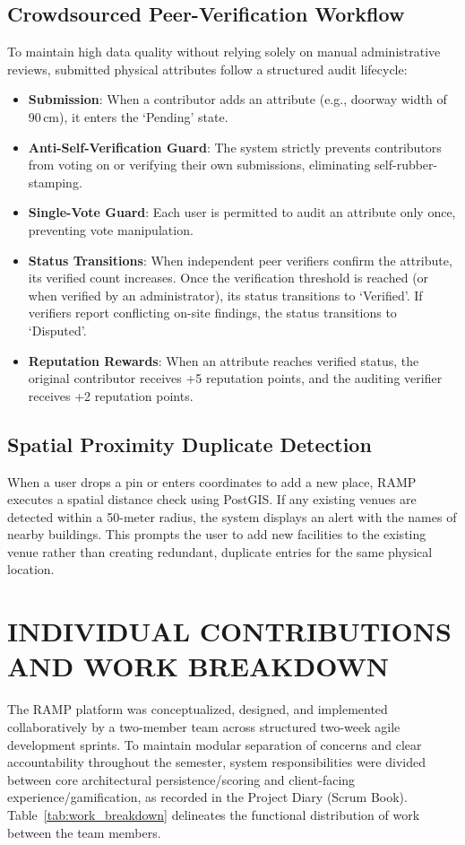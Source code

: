 \documentclass[12pt,a4paper]{report}
\begin{document}
\subsection{Crowdsourced Peer-Verification Workflow}
To maintain high data quality without relying solely on manual administrative reviews, submitted physical attributes follow a structured audit lifecycle:
\begin{itemize}
    \item \textbf{Submission}: When a contributor adds an attribute (e.g., doorway width of 90\,cm), it enters the `Pending' state.
    \item \textbf{Anti-Self-Verification Guard}: The system strictly prevents contributors from voting on or verifying their own submissions, eliminating self-rubber-stamping.
    \item \textbf{Single-Vote Guard}: Each user is permitted to audit an attribute only once, preventing vote manipulation.
    \item \textbf{Status Transitions}: When independent peer verifiers confirm the attribute, its verified count increases. Once the verification threshold is reached (or when verified by an administrator), its status transitions to `Verified'. If verifiers report conflicting on-site findings, the status transitions to `Disputed'.
    \item \textbf{Reputation Rewards}: When an attribute reaches verified status, the original contributor receives +5 reputation points, and the auditing verifier receives +2 reputation points.
\end{itemize}

\subsection{Spatial Proximity Duplicate Detection}
When a user drops a pin or enters coordinates to add a new place, RAMP executes a spatial distance check using PostGIS. If any existing venues are detected within a 50-meter radius, the system displays an alert with the names of nearby buildings. This prompts the user to add new facilities to the existing venue rather than creating redundant, duplicate entries for the same physical location.

\section{INDIVIDUAL CONTRIBUTIONS AND WORK BREAKDOWN}
The RAMP platform was conceptualized, designed, and implemented collaboratively by a two-member team across structured two-week agile development sprints. To maintain modular separation of concerns and clear accountability throughout the semester, system responsibilities were divided between core architectural persistence/scoring and client-facing experience/gamification, as recorded in the Project Diary (Scrum Book). Table~\ref{tab:work_breakdown} delineates the functional distribution of work between the team members.
\end{document}
